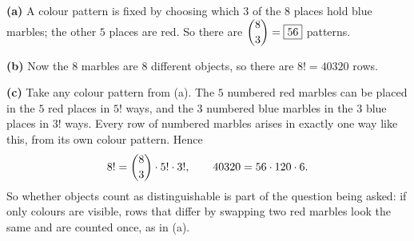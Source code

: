 \textbf{(a)} A colour pattern is fixed by choosing which $3$ of the $8$ places hold blue marbles; the other $5$ places are red. So there are $\dbinom83=\boxed{56}$ patterns.

\textbf{(b)} Now the $8$ marbles are $8$ different objects, so there are $8!=\boxed{40320}$ rows.

\textbf{(c)} Take any colour pattern from (a). The $5$ numbered red marbles can be placed in the $5$ red places in $5!$ ways, and the $3$ numbered blue marbles in the $3$ blue places in $3!$ ways. Every row of numbered marbles arises in exactly one way like this, from its own colour pattern. Hence
\[
8!=\dbinom83\cdot5!\cdot3!,\qquad 40320=56\cdot120\cdot6 .
\]
So whether objects count as distinguishable is part of the question being asked: if only colours are visible, rows that differ by swapping two red marbles look the same and are counted once, as in (a).
